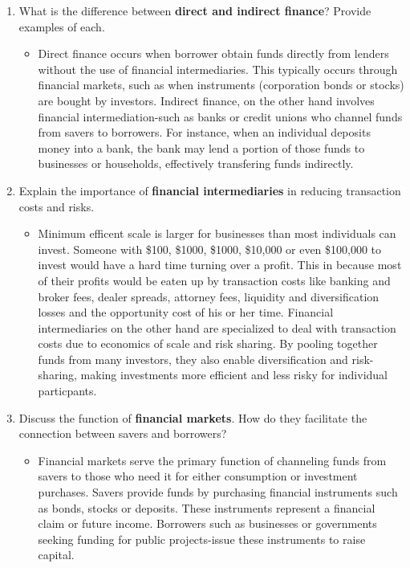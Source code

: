 \begin{enumerate}
    \item What is the difference between \textbf{direct and indirect finance}? Provide examples
    of each.
      \begin{itemize}
          \item Direct finance occurs when borrower obtain funds directly from lenders without the use of financial intermediaries. This typically occurs through financial markets, such as when instruments (corporation bonds or stocks) are bought by investors. Indirect finance, on the other hand involves financial intermediation-such as banks 
                or credit unions who channel funds from savers to borrowers. For instance, when an individual deposits money into a bank, the bank may lend a portion of those funds to businesses or households, effectively transfering funds indirectly.
      \end{itemize}
    \item Explain the importance of \textbf{financial intermediaries} in reducing transaction
    costs and risks.
      \begin{itemize}
          \item Minimum efficent scale is larger for businesses than most individuals can invest. Someone with \$100, \$1000, \$1000, \$10,000 or even \$100,000 to invest would 
                have a hard time turning over a profit. This in because most of their profits would be eaten up by transaction costs like banking and broker fees, dealer spreads, attorney 
                fees, liquidity and diversification losses and the opportunity cost of his or her time. Financial intermediaries on the other hand are specialized to deal with transaction costs due to economics of scale 
                and risk sharing. By pooling together funds from many investors, they also enable diversification and risk-sharing, making investments more efficient and less risky for individual particpants.  
      \end{itemize}

    \item Discuss the function of \textbf{financial markets}. How do they facilitate the connection
    between savers and borrowers?
       \begin{itemize}
           \item Financial markets serve the primary function of channeling funds from savers to those who need it for either consumption or investment purchases. Savers provide funds by purchasing financial instruments 
                 such as bonds, stocks or deposits. These instruments represent a financial claim or future income. Borrowers such as businesses or governments seeking funding for public projects-issue these instruments to raise capital. 
       \end{itemize}


\end{enumerate}

